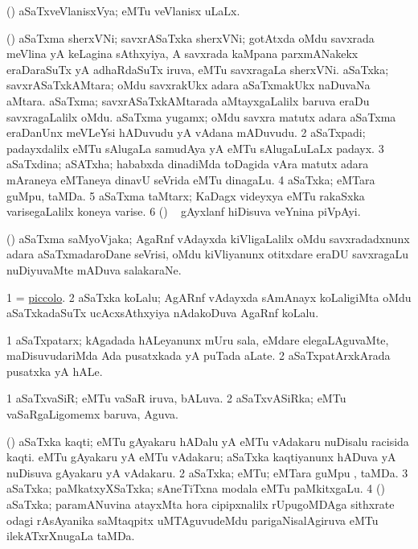 \bentry
{}
\gl{\gu}
\bmng
(\ravi) aSaTxveVlanisxVya; eMTu veVlanisx uLaLx. 
\emng
\eentry

\bentry
{}
\gl{\nA}
\bmng
\bnum
{} (\saM) 
\banum
{} aSaTxma sherxVNi; savxrASaTxka sherxVNi; gotAtxda oMdu savxrada meVlina yA keLagina sAthxyiya, A savxrada kaMpana parxmANakekx eraDaraSuTx yA adhaRdaSuTx iruva, eMTu savxragaLa sherxVNi. 
 aSaTxka; savxrASaTxkAMtara; oMdu savxrakUkx adara aSaTxmakUkx naDuvaNa aMtara. 
 aSaTxma; savxrASaTxkAMtarada aMtayxgaLalilx baruva eraDu savxragaLalilx oMdu. 
 aSaTxma yugamx; oMdu savxra matutx adara aSaTxma eraDanUnx meVLeYsi hADuvudu yA vAdana mADuvudu. 
\eanum
\numie
\num{2} aSaTxpadi; padayxdalilx eMTu sAlugaLa samudAya yA eMTu sAlugaLuLaLx padayx. 
\num{3} aSaTxdina; aSATxha; hababxda dinadiMda toDagida vAra matutx adara mAraneya eMTaneya dinavU seVrida eMTu dinagaLu. 
\num{4} aSaTxka; eMTara guMpu, taMDa. 
\num{5} aSaTxma taMtarx; KaDagx videyxya eMTu rakaSxka varisegaLalilx koneya varise. 
\num{6} (\birx) \su\ \eng{$13 \frac\bg 1\eg/\bg 2\eg$} gAyxlanf hiDisuva veYnina piVpAyi. 
\enum
\emng
\eentry

\bentry
{}
\gl{\nA}
\bmng
(\saM) aSaTxma saMyoVjaka; AgaRnf vAdayxda kiVligaLalilx oMdu savxradadxnunx adara aSaTxmadaroDane seVrisi, oMdu kiVliyanunx otitxdare eraDU savxragaLu nuDiyuvaMte mADuva salakaraNe. 
\emng
\eentry

\bentry
{}
\gl{\nA}
\bmng
\bnum
\num{1} = \hyperref{kandict_p.pdf}{P}{piccolo}{piccolo}. 
\num{2} aSaTxka koLalu; AgARnf vAdayxda sAmAnayx koLaligiMta oMdu aSaTxkadaSuTx ucAcxsAthxyiya nAdakoDuva AgaRnf koLalu. 
\enum
\emng
\eentry

\bentry
{}
\gl{\nA}
\bmng
\bnum
\num{1} aSaTxpatarx; kAgadada hALeyanunx mUru sala, eMdare  elegaLAguvaMte, maDisuvudariMda Ada pusatxkada yA puTada aLate. 
\num{2} aSaTxpatArxkArada pusatxka yA hALe. 
\enum
\emng
\eentry

\bentry
{}
\gl{\gu}
\bmng
\bnum
\num{1} aSaTxvaSiR; eMTu vaSaR iruva, bALuva. 
\num{2} aSaTxvASiRka; eMTu vaSaRgaLigomemx baruva, Aguva. 
\enum
\emng
\eentry

\bentry
{}
\gl{\nA}
\bmng
\bnum
{} (\saM) 
\banum
{} aSaTxka kaqti; eMTu gAyakaru hADalu yA eMTu vAdakaru nuDisalu racisida kaqti. 
 eMTu gAyakaru yA eMTu vAdakaru; aSaTxka kaqtiyanunx hADuva yA nuDisuva gAyakaru yA vAdakaru. 
\eanum
\numie
\num{2} aSaTxka; eMTu; eMTara guMpu , taMDa. 
\num{3} aSaTxka; paMkatxyXSaTxka; sAneTiTxna modala eMTu paMkitxgaLu. 
\num{4} (\ravi) aSaTxka; paramANuvina atayxMta hora cipipxnalilx rUpugoMDAga sithxrate odagi rAsAyanika saMtaqpitx uMTAguvudeMdu parigaNisalAgiruva eMTu ilekATxrXnugaLa taMDa. 
\enum
\emng
\eentry

